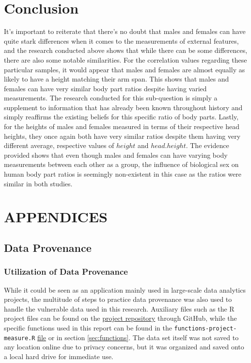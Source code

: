 \documentclass[]{article}
\begin{document}
\section{Conclusion}
\label{sec:conclusion}

It's important to reiterate that there's no doubt that males and females
can have quite stark differences when it comes to the measurements of
external features, and the research conducted above shows that while
there can be some differences, there are also some notable similarities.
For the correlation values regarding these particular samples, it would
appear that males and females are almost equally as likely to have a
height matching their arm span. This shows that males and females can
have very similar body part ratios despite having varied measurements.
The research conducted for this sub-question is simply a supplement to
information that has already been known throughout history and simply
reaffirms the existing beliefs for this specific ratio of body parts.
Lastly, for the heights of males and females measured in terms of their
respective head heights, they once again both have very similar ratios
despite them having very different average, respective values of
\(height\) and \(head.height\). The evidence provided shows that even
though males and females can have varying body measurements between each
other as a group, the influence of biological sex on human body part
ratios is seemingly non-existent in this case as the ratios were similar
in both studies.

\newpage

\section{APPENDICES}
\label{sec:appendix}

\subsection{Data Provenance}
\label{sec:appendix-data-provenance}

\subsubsection{Utilization of Data Provenance}
\label{sec:appendix-provenance-explained}

While it could be seen as an application mainly used in large-scale data
analytics projects, the multitude of steps to practice data provenance
was also used to handle the vulnerable data used in this research.
Auxiliary files such as the R project files can be found on the
\href{https://github.com/KevnBlack/WSU_STATS419_FALL2020/tree/master/PROJECT-01}{project repository}
through GitHub, while the specific functions used in this report can be
found in the \texttt{functions-project-measure.R}
\href{https://raw.githubusercontent.com/KevnBlack/WSU_STATS419_FALL2020/master/functions/functions-project-measure.R}{file}
or in section \ref{sec:functions}. The data set itself was not saved to
any location online due to privacy concerns, but it was organized and
saved onto a local hard drive for immediate use.
\end{document}
